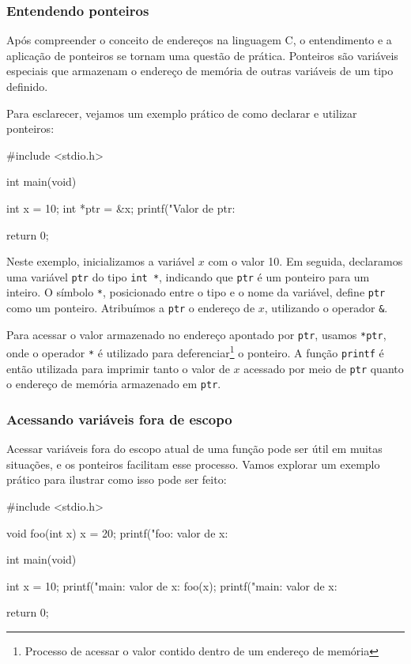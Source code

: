 \subsubsection{Entendendo ponteiros}

Após compreender o conceito de endereços na linguagem C, o entendimento e a 
aplicação de ponteiros se tornam uma questão de prática. Ponteiros são 
variáveis especiais que armazenam o endereço de memória de outras variáveis de 
um tipo definido.

Para esclarecer, vejamos um exemplo prático de como declarar e utilizar ponteiros:

\begin{excode}
    #include <stdio.h>

    int main(void)
    {
        int x = 10;
        int *ptr = &x;
        printf("Valor de ptr: %

        return 0;
    }
\end{excode}

Neste exemplo, inicializamos a variável \(x\) com o valor 10. Em seguida, 
declaramos uma variável \texttt{ptr} do tipo \texttt{int *}, indicando que 
\texttt{ptr} é um ponteiro para um inteiro. O símbolo \texttt{*}, posicionado 
entre o tipo e o nome da variável, define \texttt{ptr} como um ponteiro. 
Atribuímos a \texttt{ptr} o endereço de \(x\), utilizando o operador \texttt{\&}.

Para acessar o valor armazenado no endereço apontado por \texttt{ptr}, usamos 
\texttt{*ptr}, onde o operador \texttt{*} é utilizado para 
deferenciar\footnote{Processo de acessar o valor contido dentro de um endereço 
de memória} o ponteiro. A função \texttt{printf} é então utilizada para 
imprimir tanto o valor de \(x\) acessado por meio de \texttt{ptr} quanto o 
endereço de memória armazenado em \texttt{ptr}.

\subsubsection{Acessando variáveis fora de escopo}

Acessar variáveis fora do escopo atual de uma função pode ser útil em muitas 
situações, e os ponteiros facilitam esse processo. Vamos explorar um exemplo 
prático para ilustrar como isso pode ser feito:

\begin{excode}
    #include <stdio.h>

    void foo(int x)
    {
        x = 20;
        printf("foo: valor de x: %
    }

    int main(void)
    {
        int x = 10;
        printf("main: valor de x: %
        foo(x);
        printf("main: valor de x: %

        return 0;
    }
\end{excode}


